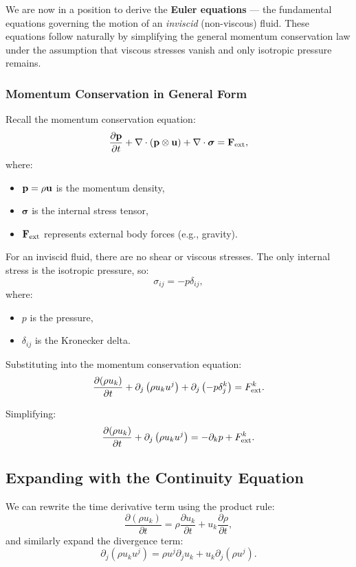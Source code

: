 We are now in a position to derive the \textbf{Euler equations} — the fundamental equations governing the motion of an \emph{inviscid} (non-viscous) fluid. These equations follow naturally by simplifying the general momentum conservation law under the assumption that viscous stresses vanish and only isotropic pressure remains.

\vspace{0.25cm}
\subsubsection*{Momentum Conservation in General Form}

Recall the momentum conservation equation:
\[
\frac{\partial {\bf p}}{\partial t} + \nabla \cdot ({\bf p} \otimes {\bf u}) + \nabla \cdot \boldsymbol{\sigma} = {\bf F}_{\rm ext},
\]
where:
\begin{itemize}
    \item ${\bf p} = \rho {\bf u}$ is the momentum density,
    \item $\boldsymbol{\sigma}$ is the internal stress tensor,
    \item ${\bf F}_{\rm ext}$ represents external body forces (e.g., gravity).
\end{itemize}

For an inviscid fluid, there are no shear or viscous stresses. The only internal stress is the isotropic pressure, so:
\[
\sigma_{ij} = -p \delta_{ij},
\]
where:
\begin{itemize}
    \item $p$ is the pressure,
    \item $\delta_{ij}$ is the Kronecker delta.
\end{itemize}

Substituting into the momentum conservation equation:
\[
\frac{\partial (\rho u_k)}{\partial t} + \partial_j \left( \rho u_k u^j \right) + \partial_j \left( -p \delta^k_j \right) = F^k_{\rm ext}.
\]

Simplifying:
\[
\frac{\partial (\rho u_k)}{\partial t} + \partial_j \left( \rho u_k u^j \right) = - \partial_k p + F^k_{\rm ext}.
\]

\subsection*{Expanding with the Continuity Equation}

We can rewrite the time derivative term using the product rule:
\[
\frac{\partial (\rho u_k)}{\partial t} = \rho \frac{\partial u_k}{\partial t} + u_k \frac{\partial \rho}{\partial t},
\]
and similarly expand the divergence term:
\[
\partial_j \left( \rho u_k u^j \right) = \rho u^j \partial_j u_k + u_k \partial_j ( \rho u^j ).
\]

